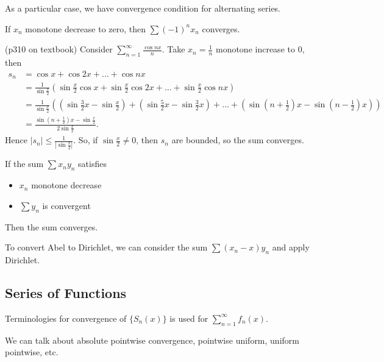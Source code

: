 As a particular case, we have convergence condition for alternating series.

\begin{theorem}
	If $x_n$ monotone decrease to zero, then $\sum (-1)^n x_n$ converges.
\end{theorem}

\begin{example}
	(p310 on textbook)
	Consider $\sum_{n=1}^{\infty} \frac{\cos nx }{n}$. Take $x_n = \frac{1}{n}$ monotone increase to $0$, then 
	\begin{align*}
		s_n &= \cos x + \cos 2x + \ldots + \cos nx \\
		&= \frac{1}{\sin \frac{x}{2}} \left( \sin \frac{x}{2} \cos x + \sin \frac{x}{2} \cos 2x + \ldots + \sin \frac{x}{2} \cos nx \right)  \\
		&= \frac{1}{\sin \frac{x}{2}} 
		\left( \left(\sin \frac{3}{2} x - \sin \frac{x}{2}\right) + \left(\sin \frac{5}{2}x - \sin \frac{3}{2} x \right)+
		\ldots + \left(\sin (n+\frac{1}{2}) x - \sin (n-\frac{1}{2})x \right)\right) \\
		&= \frac{\sin (n+\frac{1}{2})x - \sin \frac{x}{2}}{2 \sin \frac{x}{2}}
	.\end{align*}
	Hence $|s_n| \le \frac{1}{\left| \sin \frac{x}{2} \right| }$. So, if $\sin \frac{x}{2}\neq 0$, then $s_n$ are bounded, so the sum converges.
\end{example}

\begin{theorem}
	If the sum $\sum x_n y_n$ satisfies
	\begin{itemize}
		\item $x_n$ monotone decrease
		\item $\sum y_n$ is convergent
	\end{itemize}
	Then the sum converges.
\end{theorem}

To convert Abel to Dirichlet, we can consider the sum
$\sum (x_n - x) y_n$ and apply Dirichlet.

\subsection{Series of Functions}

Terminologies for convergence of  $\{S_n(x)\}$ is used for $\sum_{n=1}^{\infty} f_n(x)$.

We can talk about absolute pointwise convergence, pointwise uniform, uniform pointwise, etc.

